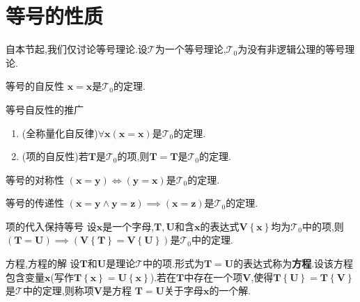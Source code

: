\section{等号的性质}

自本节起,我们仅讨论等号理论.设$\mathcal{T}$为一个等号理论,$\mathcal{T}_{0}$为没有非逻辑公理的等号理论.

\begin{theorem}{等号的自反性}{}
	$\boldsymbol{x}=\boldsymbol{x}$是$\mathcal{T}_{0}$的定理.
\end{theorem}

\begin{corollary}{等号自反性的推广}{}
	\begin{enumerate}
		\item (全称量化自反律)$\forall\boldsymbol{x}\left(\boldsymbol{x}=\boldsymbol{x}\right)$是$\mathcal{T}_{0}$的定理.
		\item (项的自反性)若$\boldsymbol{T}$是$\mathcal{T}_{0}$的项,则$\boldsymbol{T}=\boldsymbol{T}$是$\mathcal{T}_{0}$的定理.
	\end{enumerate}
\end{corollary}

\begin{theorem}{等号的对称性}{}
	$\left(\boldsymbol{x}=\boldsymbol{y}\right)\iff\left(\boldsymbol{y}=\boldsymbol{x}\right)$是$\mathcal{T}_{0}$的定理.
\end{theorem}

\begin{theorem}{等号的传递性}{}
	$\left(\boldsymbol{x}=\boldsymbol{y}\wedge\boldsymbol{y}=\boldsymbol{z}\right)\implies\left(\boldsymbol{x}=\boldsymbol{z}\right)$是$\mathcal{T}_{0}$的定理.
\end{theorem}

\begin{metatheorem}{项的代入保持等号}{}
	设$\boldsymbol{x}$是一个字母,$\boldsymbol{T},\boldsymbol{U}$和含$\boldsymbol{x}$的表达式$\boldsymbol{V}\left\{\boldsymbol{x}\right\}$均为$\mathcal{T}_{0}$中的项,则$\left(\boldsymbol{T}=\boldsymbol{U}\right)\implies\left(\boldsymbol{V}\left\{\boldsymbol{T}\right\}=\boldsymbol{V}\left\{\boldsymbol{U}\right\}\right)$是$\mathcal{T}_{0}$中的定理.
\end{metatheorem}

\begin{definition}{方程,方程的解}{}
	设$\boldsymbol{T}$和$\boldsymbol{U}$是理论$\mathcal{T}$中的项.形式为$\boldsymbol{T}=\boldsymbol{U}$的表达式称为\textbf{方程}.设该方程包含变量$\boldsymbol{x}$(写作$\boldsymbol{T}\left\{\boldsymbol{x}\right\}=\boldsymbol{U}\left\{\boldsymbol{x}\right\}$).若在$\boldsymbol{T}$中存在一个项$\boldsymbol{V}$,使得$\boldsymbol{T}\left\{\boldsymbol{U}\right\}=\boldsymbol{T}\left\{\boldsymbol{V}\right\}$是$\mathcal{T}$中的定理,则称项$\boldsymbol{V}$是方程 $\boldsymbol{T}=\boldsymbol{U}$关于字母$\boldsymbol{x}$的一个解.
\end{definition}

